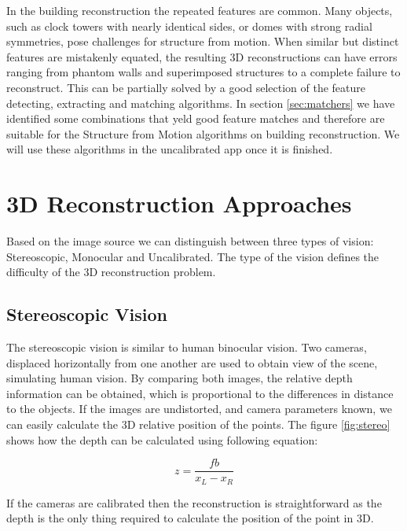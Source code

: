 In the building reconstruction the repeated features are common. Many objects, such as clock towers with nearly identical sides, or domes with strong radial symmetries, pose challenges for structure from motion. When similar but distinct features are mistakenly equated, the resulting 3D reconstructions can have errors ranging from phantom walls and superimposed structures to a complete failure to reconstruct. This can be partially solved by a good selection of the feature detecting, extracting and matching algorithms. In section \ref{sec:matchers} we have identified some combinations that yeld good feature matches and therefore are suitable for the Structure from Motion algorithms on building reconstruction. We will use these algorithms in the uncalibrated app once it is finished.

\section{3D Reconstruction Approaches}
Based on the image source we can distinguish between three types of vision: Stereoscopic, Monocular and Uncalibrated. The type of the vision defines the difficulty of the 3D reconstruction problem.

\subsection*{Stereoscopic Vision}
The stereoscopic vision is similar to human binocular vision. Two cameras, displaced horizontally from one another are used to obtain view of the scene, simulating human vision. By comparing both images, the relative depth information can be obtained, which is proportional to the differences in distance to the objects. If the images are undistorted, and camera parameters known, we can easily calculate the 3D relative position of the points. The figure \ref{fig:stereo} shows how the depth can be calculated using following equation:

\begin{equation}
	z=\frac{f b}{x_L - x_R}
\end{equation}

If the cameras are calibrated then the reconstruction is straightforward as the depth is the only thing required to calculate the position of the point in 3D.

